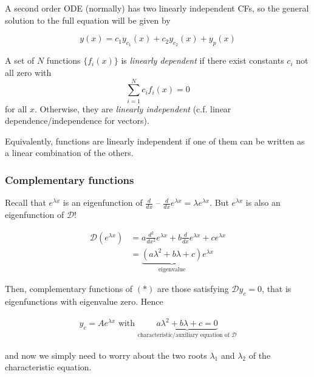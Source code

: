 \documentclass{../template/note}
\begin{document}
    A second order ODE (normally) has two linearly independent CFs, so the general solution to the full equation will be given by

    \[
        y(x) = c_1 y_{c_1}(x) + c_2 y_{c_2}(x) + y_p(x)
    \]

    \begin{definition}
        A set of \(N\) functions \(\{f_i(x)\}\) is \emph{linearly dependent} if there exist constants \(c_i\) not all zero with
        \[
            \sum_{i=1}^N c_i f_i(x) = 0
        \]
        for all \(x\). Otherwise, they are \emph{linearly independent} (c.f. linear dependence/independence for vectors).
    \end{definition}
    
    Equivalently, functions are linearly independent if one of them can be written as a linear combination of the others.

    \subsubsection{Complementary functions}

    Recall that \(e^{\lambda x}\) is an eigenfunction of \(\frac{d}{dx}\) -- \(\frac{d}{dx} e^{\lambda x} = \lambda e^{\lambda x}\). But \(e^{\lambda x}\) is also an eigenfunction of \(\mathcal D\)!

    \begin{align*}
        \mathcal D(e^{\lambda x}) &= a \frac{d^2}{dx^2}e^{\lambda x} + b\frac{d}{dx}e^{\lambda x} + ce^{\lambda x} \\
        &= \underbrace{(a\lambda^2 + b\lambda + c)}_{\text{eigenvalue}} e^{\lambda x}
    \end{align*}

    Then, complementary functions of \((*)\) are those satisfying \(\mathcal Dy_c = 0\), that is eigenfunctions with eigenvalue zero. Hence
    
    \begin{align*}
        y_c = Ae^{\lambda x} \text{ with } \underbrace{a\lambda^2 + b\lambda + c = 0}_{\text{characteristic/auxiliary equation of } \mathcal D}
    \end{align*}
    
    and now we simply need to worry about the two roots \(\lambda_1\) and \(\lambda_2\) of the characteristic equation.
\end{document}

